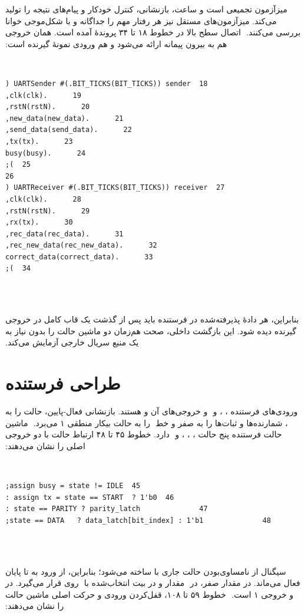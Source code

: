 ‫میزآزمون تجمیعی است و ساعت، بازنشانی، کنترل خودکار و پیام‌های نتیجه را تولید
‫می‌کند. میزآزمون‌های مستقل نیز هر رفتار مهم را جداگانه و با شکل‌موجی خوانا بررسی می‌کنند.
‫
‫اتصال سطح بالا در خطوط ۱۸ تا ۳۴ پروندهٔ  آمده است. همان خروجی
‫ هم به بیرون پیمانه ارائه می‌شود و هم ورودی  نمونهٔ گیرنده است:
‫
‫\begin{dsdlcodeblock}
‫\begin{verbatim}
‫18  UARTSender #(.BIT_TICKS(BIT_TICKS)) sender (
‫19      .clk(clk),
‫20      .rstN(rstN),
‫21      .new_data(new_data),
‫22      .send_data(send_data),
‫23      .tx(tx),
‫24      .busy(busy)
‫25  );
‫26
‫27  UARTReceiver #(.BIT_TICKS(BIT_TICKS)) receiver (
‫28      .clk(clk),
‫29      .rstN(rstN),
‫30      .rx(tx),
‫31      .rec_data(rec_data),
‫32      .rec_new_data(rec_new_data),
‫33      .correct_data(correct_data)
‫34  );
‫\end{verbatim}
‫\end{dsdlcodeblock}
‫
‫بنابراین، هر دادهٔ پذیرفته‌شده در فرستنده باید پس از گذشت یک قاب کامل در خروجی گیرنده
‫دیده شود. این بازگشت داخلی، صحت هم‌زمان دو ماشین حالت را بدون نیاز به یک منبع سریال
‫خارجی آزمایش می‌کند.
‫
‫
‫\section{طراحی فرستنده}
‫
‫ورودی‌های فرستنده ، ،  و
‫ و خروجی‌های آن  و  هستند.
‫بازنشانی فعال-پایین، حالت را به ،
‫شمارنده‌ها و ثبات‌ها را به صفر و خط
‫ را به
‫حالت بیکار منطقی ۱ می‌برد.
‫
‫ماشین حالت فرستنده پنج حالت ، ، ،  و
‫ دارد. خطوط ۴۵ تا ۴۸ ارتباط حالت با دو خروجی اصلی را نشان می‌دهند:
‫
‫\begin{dsdlcodeblock}
‫\begin{verbatim}
‫45  assign busy = state != IDLE;
‫46  assign tx = state == START  ? 1'b0 :
‫47              state == PARITY ? parity_latch :
‫48              state == DATA   ? data_latch[bit_index] : 1'b1;
‫\end{verbatim}
‫\end{dsdlcodeblock}
‫
‫سیگنال  از نامساوی‌بودن حالت جاری با  ساخته می‌شود؛ بنابراین، از ورود
‫به  تا پایان  فعال می‌ماند. در  مقدار صفر، در
‫ مقدار  و در  بیت انتخاب‌شده با
‫ روی  قرار می‌گیرد. در  و  خروجی ۱ است.
‫
‫خطوط ۵۹ تا ۱۰۸، قفل‌کردن ورودی و حرکت اصلی ماشین حالت را نشان می‌دهند:
